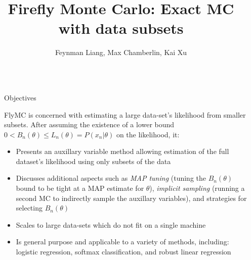 \documentclass[final]{beamer}
\title{Firefly Monte Carlo: Exact MC with data subsets} %
\author{Feynman Liang, Max Chamberlin, Kai Xu} %
\institute{Cambridge University Engineering Department} %
\newlength{\sepwid}
\newlength{\onecolwid}
\begin{document}

\setlength{\belowcaptionskip}{2ex} %
\setlength\belowdisplayshortskip{2ex} %

\begin{frame}[t] %

\begin{columns}[t] %

\begin{column}{\sepwid}\end{column} %

\begin{column}{\onecolwid} %


\begin{alertblock}{Objectives}

FlyMC is concerned with estimating a large data-set's likelihood from smaller subsets.
After assuming the existence of a lower bound $0 <
  B_n(\theta) \leq L_n(\theta) = P(x_n | \theta)$ on the likelihood, it:
\begin{itemize}
  \item Presents an auxillary variable method allowing estimation of the full dataset's likelihood
    using only subsets of the data
  \item Discusses additional aspects such as \emph{MAP tuning} (tuning
    the $B_n(\theta)$ bound to be tight at a MAP estimate for $\theta$),
    \emph{implicit sampling} (running a second MC to indirectly sample the auxillary
    variables), and strategies for selecting $B_n(\theta)$
  \item Scales to large data-sets which do not fit on a single machine
  \item Is general purpose and applicable to a variety of methods, including:
    logistic regression, softmax classification, and robust linear regression
\end{itemize}


\end{alertblock}
\end{column}
\end{columns}
\end{frame}
\end{document}
